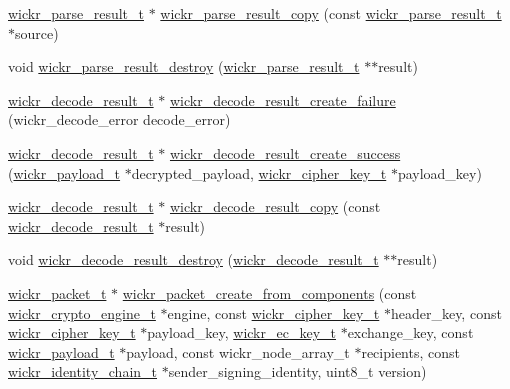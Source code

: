 \begin{DoxyCompactItemize}
\item 
\hyperlink{structwickr__parse__result}{wickr\+\_\+parse\+\_\+result\+\_\+t} $\ast$ \hyperlink{group__wickr__protocol_ga1671066ddc19b38ed05d4460d5a96706}{wickr\+\_\+parse\+\_\+result\+\_\+copy} (const \hyperlink{structwickr__parse__result}{wickr\+\_\+parse\+\_\+result\+\_\+t} $\ast$source)
\item 
void \hyperlink{group__wickr__protocol_ga706d39419c8991f417f37f556cee8df9}{wickr\+\_\+parse\+\_\+result\+\_\+destroy} (\hyperlink{structwickr__parse__result}{wickr\+\_\+parse\+\_\+result\+\_\+t} $\ast$$\ast$result)
\item 
\hyperlink{structwickr__decode__result}{wickr\+\_\+decode\+\_\+result\+\_\+t} $\ast$ \hyperlink{group__wickr__protocol_ga2bd6f49ed993d2290aaafa514eba43ed}{wickr\+\_\+decode\+\_\+result\+\_\+create\+\_\+failure} (wickr\+\_\+decode\+\_\+error decode\+\_\+error)
\item 
\hyperlink{structwickr__decode__result}{wickr\+\_\+decode\+\_\+result\+\_\+t} $\ast$ \hyperlink{group__wickr__protocol_ga633aaf4cb6159be0110401f06dae458c}{wickr\+\_\+decode\+\_\+result\+\_\+create\+\_\+success} (\hyperlink{structwickr__payload}{wickr\+\_\+payload\+\_\+t} $\ast$decrypted\+\_\+payload, \hyperlink{structwickr__cipher__key}{wickr\+\_\+cipher\+\_\+key\+\_\+t} $\ast$payload\+\_\+key)
\item 
\hyperlink{structwickr__decode__result}{wickr\+\_\+decode\+\_\+result\+\_\+t} $\ast$ \hyperlink{group__wickr__protocol_ga36183bf96372661f890aefbe388bd32a}{wickr\+\_\+decode\+\_\+result\+\_\+copy} (const \hyperlink{structwickr__decode__result}{wickr\+\_\+decode\+\_\+result\+\_\+t} $\ast$result)
\item 
void \hyperlink{group__wickr__protocol_ga94154ab44a6c2e9b97a115e37416efe1}{wickr\+\_\+decode\+\_\+result\+\_\+destroy} (\hyperlink{structwickr__decode__result}{wickr\+\_\+decode\+\_\+result\+\_\+t} $\ast$$\ast$result)
\item 
\hyperlink{structwickr__packet}{wickr\+\_\+packet\+\_\+t} $\ast$ \hyperlink{group__wickr__protocol_gaf34d8082df52a7ade2fea54eea65d342}{wickr\+\_\+packet\+\_\+create\+\_\+from\+\_\+components} (const \hyperlink{structwickr__crypto__engine}{wickr\+\_\+crypto\+\_\+engine\+\_\+t} $\ast$engine, const \hyperlink{structwickr__cipher__key}{wickr\+\_\+cipher\+\_\+key\+\_\+t} $\ast$header\+\_\+key, const \hyperlink{structwickr__cipher__key}{wickr\+\_\+cipher\+\_\+key\+\_\+t} $\ast$payload\+\_\+key, \hyperlink{structwickr__ec__key}{wickr\+\_\+ec\+\_\+key\+\_\+t} $\ast$exchange\+\_\+key, const \hyperlink{structwickr__payload}{wickr\+\_\+payload\+\_\+t} $\ast$payload, const wickr\+\_\+node\+\_\+array\+\_\+t $\ast$recipients, const \hyperlink{structwickr__identity__chain}{wickr\+\_\+identity\+\_\+chain\+\_\+t} $\ast$sender\+\_\+signing\+\_\+identity, uint8\+\_\+t version)

\end{DoxyCompactItemize}
